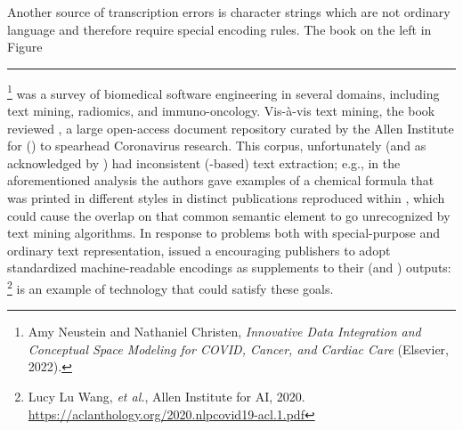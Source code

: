 \documentclass[11pt]{article}
\newcommand\reduline{\bgroup\markoverwith
{\textcolor{ru}{\rule[-.25ex]{3pt}{3.4pt}}}\ULon}
\DeclareRobustCommand{\xfigunderline}[1]{\reduline{#1}
\llap{\dashuline{\phantom{#1}}}%
}
\renewcommand{\Atref}[1]{\textcolor{rgrAt!30}{\xfigunderline{\hspace{-2pt}\autoref{#1}\hspace*{-2pt}}}}
\begin{document}
{{\begin{description}
\pseudoIndent{} Another source of transcription errors is 
character strings which are not ordinary language and therefore 
require special encoding rules.  The book on the 
left in Figure \Atref{fig:ss10}\footnote{\hspace*{4pt}Amy Neustein 
and Nathaniel Christen, \textit{Innovative Data Integration and Conceptual Space Modeling for COVID, Cancer, and Cardiac Care} 
(Elsevier, 2022).} was a survey of biomedical software engineering in
several domains, including text mining, radiomics, and immuno-oncology.  
Vis-\`a-vis text mining, the book reviewed \CORDNineteen{}, a 
large open-access document repository curated by the Allen Institute 
for \AI{} (\AItwo{}) to spearhead Coronavirus research.  This corpus, unfortunately 
(and as acknowledged by \AItwo{}) had inconsistent (\PDF{}-based) text 
extraction; e.g., in the aforementioned analysis the authors gave examples of a 
chemical formula that was printed in different styles in distinct 
publications reproduced within \CORDNineteen{}, which could cause the 
overlap on that common semantic element to go unrecognized by 
text mining algorithms.  In response to problems both with 
special-purpose and ordinary text representation, \AItwo{} issued a 
 encouraging publishers to adopt standardized 
machine-readable encodings as supplements to their \PDF{} (and 
\HTML{}) outputs: \footnote{\hspace*{5pt}Lucy Lu Wang, \textit{et al.}, 
 Allen Institute for AI, 2020. 
\href{https://aclanthology.org/2020.nlpcovid19-acl.1.pdf}{https://aclanthology.org/2020.nlpcovid19-acl.1.pdf}}  \lPacTk{} is an example of technology 
that could satisfy these goals. 

\clearpage{}




\end{description}}}
\end{document}
